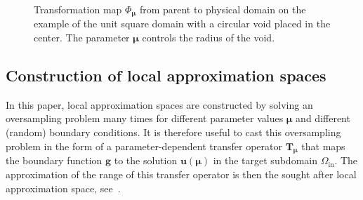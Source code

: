 \documentclass[a4paper]{eccomas_paper-2024}
\begin{document}
\begin{figure}
    \centering
    
    \caption{Transformation map $\Phi_{\bm\mu}$ from parent to physical domain on the example of the unit square domain with a circular void placed in the center. The parameter $\bm\mu$ controls the radius of the void.}\label{fig:transformationmap}
\end{figure}



\subsection{Construction of local approximation spaces} %
\label{sub:Construction of local approximation spaces}
In this paper, local approximation spaces are constructed by solving an oversampling problem many times for different parameter values $\bm\mu$ and different (random) boundary conditions.
It is therefore useful to cast this oversampling problem in the form of a parameter-dependent transfer operator $\bm{T}_{\bm\mu}$ that
maps the boundary function $\bm{g}$ to the solution $\bm{u}(\bm\mu)$ in the target subdomain $\varOmega_{\mathrm{in}}$.
The approximation of the range of this transfer operator is then the sought after local approximation space, see~\cite{Buhr2018Randomized}.
\end{document}
